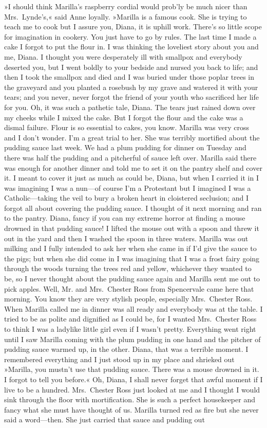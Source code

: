 »I should think Marilla's raspberry cordial would prob'ly be much nicer than Mrs.~Lynde's,« said Anne loyally. »Marilla is a famous cook. She is trying to teach me to cook but I assure you, Diana, it is uphill work. There's so little scope for imagination in cookery. You just have to go by rules. The last time I made a cake I forgot to put the flour in. I was thinking the loveliest story about you and me, Diana. I thought you were desperately ill with smallpox and everybody deserted you, but I went boldly to your bedside and nursed you back to life; and then I took the smallpox and died and I was buried under those poplar trees in the graveyard and you planted a rosebush by my grave and watered it with your tears; and you never, never forgot the friend of your youth who sacrificed her life for you. Oh, it was such a pathetic tale, Diana. The tears just rained down over my cheeks while I mixed the cake. But I forgot the flour and the cake was a dismal failure. Flour is so essential to cakes, you know. Marilla was very cross and I don't wonder. I'm a great trial to her. She was terribly mortified about the pudding sauce last week. We had a plum pudding for dinner on Tuesday and there was half the pudding and a pitcherful of sauce left over. Marilla said there was enough for another dinner and told me to set it on the pantry shelf and cover it. I meant to cover it just as much as could be, Diana, but when I carried it in I was imagining I was a nun—of course I'm a Protestant but I imagined I was a Catholic—taking the veil to bury a broken heart in cloistered seclusion; and I forgot all about covering the pudding sauce. I thought of it next morning and ran to the pantry. Diana, fancy if you can my extreme horror at finding a mouse drowned in that pudding sauce! I lifted the mouse out with a spoon and threw it out in the yard and then I washed the spoon in three waters. Marilla was out milking and I fully intended to ask her when she came in if I'd give the sauce to the pigs; but when she did come in I was imagining that I was a frost fairy going through the woods turning the trees red and yellow, whichever they wanted to be, so I never thought about the pudding sauce again and Marilla sent me out to pick apples. Well, Mr. and Mrs.~Chester Ross from Spencervale came here that morning. You know they are very stylish people, especially Mrs.~Chester Ross. When Marilla called me in dinner was all ready and everybody was at the table. I tried to be as polite and dignified as I could be, for I wanted Mrs.~Chester Ross to think I was a ladylike little girl even if I wasn't pretty. Everything went right until I saw Marilla coming with the plum pudding in one hand and the pitcher of pudding sauce warmed up, in the other. Diana, that was a terrible moment. I remembered everything and I just stood up in my place and shrieked out »Marilla, you mustn't use that pudding sauce. There was a mouse drowned in it. I forgot to tell you before.« Oh, Diana, I shall never forget that awful moment if I live to be a hundred. Mrs.~Chester Ross just looked at me and I thought I would sink through the floor with mortification. She is such a perfect housekeeper and fancy what she must have thought of us. Marilla turned red as fire but she never said a word—then. She just carried that sauce and pudding out 